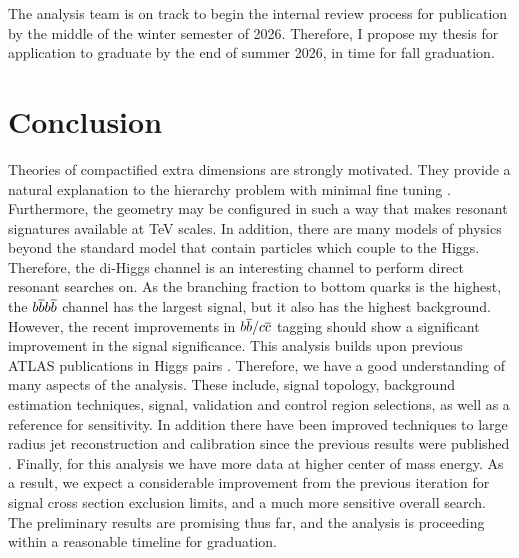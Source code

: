\documentclass[12pt]{article}
\begin{document}
The analysis team is on track to begin the internal review process for
publication by the middle of the winter semester of 2026. Therefore, I propose
my thesis for application to graduate by the end of summer 2026, in time for
fall graduation.



\section{Conclusion}

Theories of compactified extra dimensions are strongly
motivated. They provide a natural explanation to the hierarchy problem with
minimal fine tuning \cite{RandallSundrumOriginal, bsm}. Furthermore, the
geometry may be configured in such a way that makes resonant signatures
available at TeV scales. In addition, there are many models of physics beyond
the standard model that contain particles which couple to the Higgs. Therefore,
the di-Higgs channel is an interesting channel to perform direct resonant
searches on. As the branching fraction to bottom quarks is the highest, the
$b\overline{b}b\overline{b}$ channel has the largest signal, but it also has the highest
background. However, the recent improvements in $b\overline{b}/c\overline{c}$ tagging should
show a significant improvement in the signal significance. This analysis builds
upon previous ATLAS publications in Higgs pairs \cite{atlas_resonant_2022,
atlas_hhbbbb_vbf}. Therefore, we have a good understanding of many aspects of
the analysis. These include, signal topology, background estimation techniques,
signal, validation and control region selections, as well as a reference for
sensitivity. In addition there have been improved techniques to large radius jet
reconstruction and calibration since the previous results were published
\cite{large_r_jet}. Finally, for this analysis we have more data at higher
center of mass energy. As a result, we expect a considerable improvement from
the previous iteration for signal cross section exclusion limits, and a much
more sensitive overall search. The preliminary results are promising thus far,
and the analysis is proceeding within a reasonable timeline for graduation.


\newpage
% 


\end{document}
